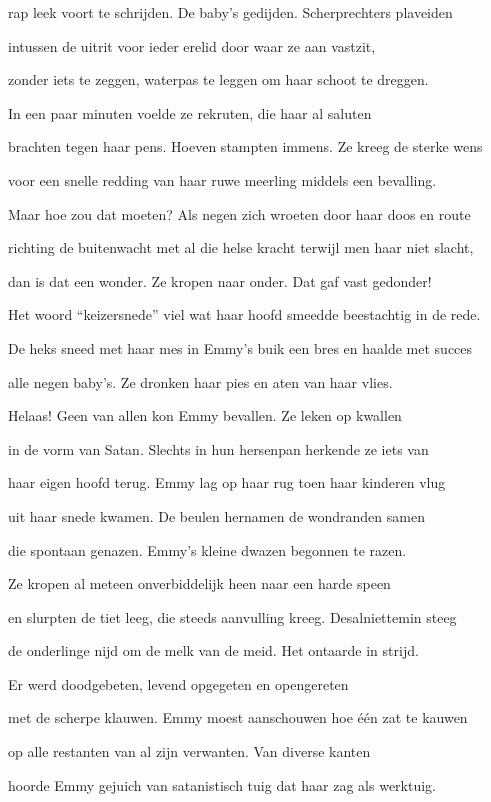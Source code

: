 rap leek voort te schrijden.
De baby’s gedijden.
Scherprechters plaveiden

intussen de uitrit
voor ieder erelid
door waar ze aan vastzit,

zonder iets te zeggen,
waterpas te leggen
om haar schoot te dreggen.

In een paar minuten
voelde ze rekruten,
die haar al saluten

brachten tegen haar pens.
Hoeven stampten immens.
Ze kreeg de sterke wens

voor een snelle redding
van haar ruwe meerling
middels een bevalling.

Maar hoe zou dat moeten?
Als negen zich wroeten
door haar doos en route

richting de buitenwacht
met al die helse kracht
terwijl men haar niet slacht,

dan is dat een wonder.
Ze kropen naar onder.
Dat gaf vast gedonder!

Het woord “keizersnede”
viel wat haar hoofd smeedde
beestachtig in de rede.

De heks sneed met haar mes
in Emmy’s buik een bres
en haalde met succes

alle negen baby’s.
Ze dronken haar pies
en aten van haar vlies.

Helaas! Geen van allen
kon Emmy bevallen.
Ze leken op kwallen

in de vorm van Satan.
Slechts in hun hersenpan
herkende ze iets van

haar eigen hoofd terug.
Emmy lag op haar rug
toen haar kinderen vlug

uit haar snede kwamen.
De beulen hernamen
de wondranden samen

die spontaan genazen.
Emmy’s kleine dwazen
begonnen te razen.

Ze kropen al meteen
onverbiddelijk heen
naar een harde speen

en slurpten de tiet leeg,
die steeds aanvulling kreeg.
Desalniettemin steeg

de onderlinge nijd
om de melk van de meid.
Het ontaarde in strijd.

Er werd doodgebeten,
levend opgegeten
en opengereten

met de scherpe klauwen.
Emmy moest aanschouwen
hoe één zat te kauwen

op alle restanten
van al zijn verwanten.
Van diverse kanten

hoorde Emmy gejuich
van satanistisch tuig
dat haar zag als werktuig.

